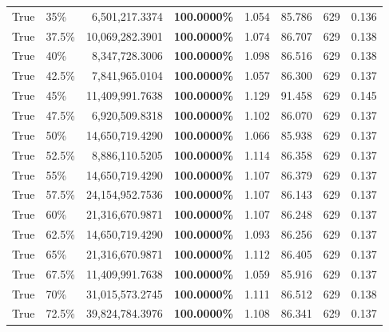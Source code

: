 \begin{table}[H]
\begin{tabular}{|m{}| m{}| r | R{0.13\textwidth}| R{0.09\textwidth}| R{0.09\textwidth}| R{0.1\textwidth}| R{0.11\textwidth}|}
 
True & 35\% & 6,501,217.3374 & \bfseries \color{red} 100.0000\% & 1.054 & 85.786 & 629 & 0.136 \\
 
True & 37.5\% & 10,069,282.3901 & \bfseries \color{red} 100.0000\% & 1.074 & 86.707 & 629 & 0.138 \\
 
True & 40\% & 8,347,728.3006 & \bfseries \color{red} 100.0000\% & 1.098 & 86.516 & 629 & 0.138 \\
 
True & 42.5\% & 7,841,965.0104 & \bfseries \color{red} 100.0000\% & 1.057 & 86.300 & 629 & 0.137 \\
 
True & 45\% & 11,409,991.7638 & \bfseries \color{red} 100.0000\% & 1.129 & 91.458 & 629 & 0.145 \\
 
True & 47.5\% & 6,920,509.8318 & \bfseries \color{red} 100.0000\% & 1.102 & 86.070 & 629 & 0.137 \\
 
True & 50\% & 14,650,719.4290 & \bfseries \color{red} 100.0000\% & 1.066 & 85.938 & 629 & 0.137 \\
 
True & 52.5\% & 8,886,110.5205 & \bfseries \color{red} 100.0000\% & 1.114 & 86.358 & 629 & 0.137 \\
 
True & 55\% & 14,650,719.4290 & \bfseries \color{red} 100.0000\% & 1.107 & 86.379 & 629 & 0.137 \\
 
True & 57.5\% & 24,154,952.7536 & \bfseries \color{red} 100.0000\% & 1.107 & 86.143 & 629 & 0.137 \\
 
True & 60\% & 21,316,670.9871 & \bfseries \color{red} 100.0000\% & 1.107 & 86.248 & 629 & 0.137 \\
 
True & 62.5\% & 14,650,719.4290 & \bfseries \color{red} 100.0000\% & 1.093 & 86.256 & 629 & 0.137 \\
 
True & 65\% & 21,316,670.9871 & \bfseries \color{red} 100.0000\% & 1.112 & 86.405 & 629 & 0.137 \\
 
True & 67.5\% & 11,409,991.7638 & \bfseries \color{red} 100.0000\% & 1.059 & 85.916 & 629 & 0.137 \\
 
True & 70\% & 31,015,573.2745 & \bfseries \color{red} 100.0000\% & 1.111 & 86.512 & 629 & 0.138 \\
 
True & 72.5\% & 39,824,784.3976 & \bfseries \color{red} 100.0000\% & 1.108 & 86.341 & 629 & 0.137 \\

\end{tabular}
\end{table}
